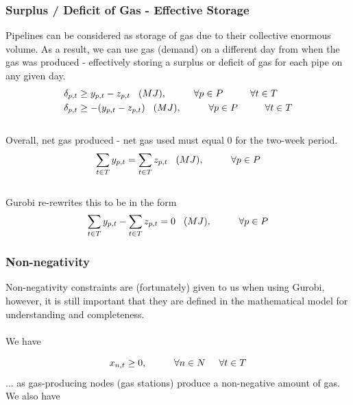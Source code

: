\documentclass{article}
\begin{document}
\subsubsection{Surplus / Deficit of Gas - Effective Storage}
Pipelines can be considered as storage of gas due to their collective enormous volume. As a result, we can use gas (demand) on a different day from when the gas was produced - effectively storing a surplus or deficit of gas for each pipe on any given day.\\
\begin{align}
        \delta_{p, t} &\geq y_{p, t} - z_{p, t} \hspace{0.3cm} (MJ), \hspace{1cm} \forall p \in P \hspace{1cm} \forall t \in T \\
        \delta_{p, t} &\geq - (y_{p, t} - z_{p, t}) \hspace{0.3cm} (MJ), \hspace{1cm} \forall p \in P \hspace{1cm} \forall t \in T
\end{align}
\\
Overall, net gas produced - net gas used must equal 0 for the two-week period.\\
\[\sum_{t\in T}y_{p,t} = \sum_{t\in T}z_{p,t} \hspace{0.3cm} (MJ), \hspace{1cm} \forall p \in P\]
\\
Gurobi re-rewrites this to be in the form
\\
\[\sum_{t\in T}y_{p,t} - \sum_{t\in T}z_{p,t} = 0 \hspace{0.3cm} (MJ), \hspace{1cm} \forall p \in P\]

\subsubsection{Non-negativity}
\bigskip
Non-negativity constraints are (fortunately) given to us when using Gurobi, however, it is still important that they are defined in the mathematical model for understanding and completeness.\\
\\
We have

\[x_{n,t} \geq 0, \hspace{1cm} \forall n \in N \hspace{0.5cm} \forall t \in T\]
... as gas-producing nodes (gas stations) produce a non-negative amount of gas.
We also have
\end{document}
